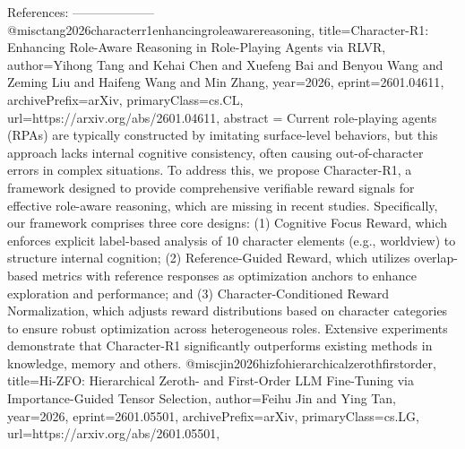         References:
        --------------------
        @misc{tang2026characterr1enhancingroleawarereasoning,
      title={Character-R1: Enhancing Role-Aware Reasoning in Role-Playing Agents via RLVR}, 
      author={Yihong Tang and Kehai Chen and Xuefeng Bai and Benyou Wang and Zeming Liu and Haifeng Wang and Min Zhang},
      year={2026},
      eprint={2601.04611},
      archivePrefix={arXiv},
      primaryClass={cs.CL},
      url={https://arxiv.org/abs/2601.04611},
      abstract = {Current role-playing agents (RPAs) are typically constructed by imitating surface-level behaviors, but this approach lacks internal cognitive consistency, often causing out-of-character errors in complex situations. To address this, we propose Character-R1, a framework designed to provide comprehensive verifiable reward signals for effective role-aware reasoning, which are missing in recent studies. Specifically, our framework comprises three core designs: (1) Cognitive Focus Reward, which enforces explicit label-based analysis of 10 character elements (e.g., worldview) to structure internal cognition; (2) Reference-Guided Reward, which utilizes overlap-based metrics with reference responses as optimization anchors to enhance exploration and performance; and (3) Character-Conditioned Reward Normalization, which adjusts reward distributions based on character categories to ensure robust optimization across heterogeneous roles. Extensive experiments demonstrate that Character-R1 significantly outperforms existing methods in knowledge, memory and others.}
}@misc{jin2026hizfohierarchicalzerothfirstorder,
      title={Hi-ZFO: Hierarchical Zeroth- and First-Order LLM Fine-Tuning via Importance-Guided Tensor Selection}, 
      author={Feihu Jin and Ying Tan},
      year={2026},
      eprint={2601.05501},
      archivePrefix={arXiv},
      primaryClass={cs.LG},
      url={https://arxiv.org/abs/2601.05501},
}
